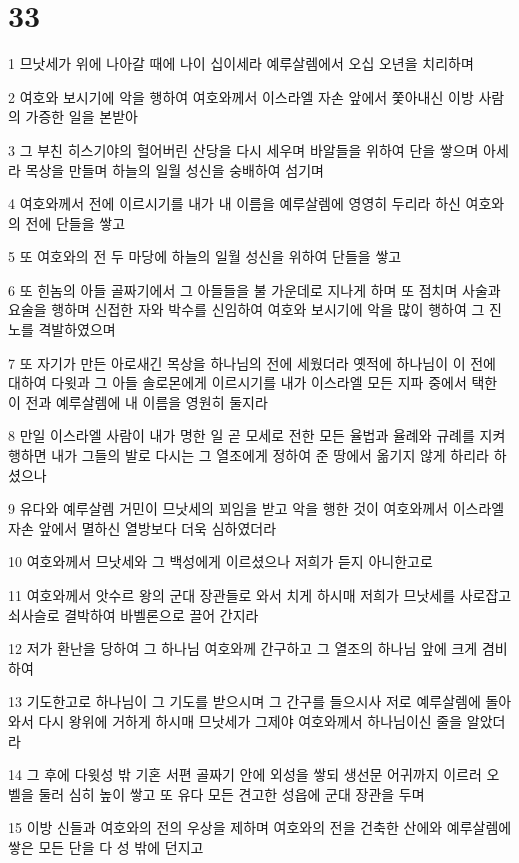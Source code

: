 \chapter{33}

\par 1 므낫세가 위에 나아갈 때에 나이 십이세라 예루살렘에서 오십 오년을 치리하며
\par 2 여호와 보시기에 악을 행하여 여호와께서 이스라엘 자손 앞에서 쫓아내신 이방 사람의 가증한 일을 본받아
\par 3 그 부친 히스기야의 헐어버린 산당을 다시 세우며 바알들을 위하여 단을 쌓으며 아세라 목상을 만들며 하늘의 일월 성신을 숭배하여 섬기며
\par 4 여호와께서 전에 이르시기를 내가 내 이름을 예루살렘에 영영히 두리라 하신 여호와의 전에 단들을 쌓고
\par 5 또 여호와의 전 두 마당에 하늘의 일월 성신을 위하여 단들을 쌓고
\par 6 또 힌놈의 아들 골짜기에서 그 아들들을 불 가운데로 지나게 하며 또 점치며 사술과 요술을 행하며 신접한 자와 박수를 신임하여 여호와 보시기에 악을 많이 행하여 그 진노를 격발하였으며
\par 7 또 자기가 만든 아로새긴 목상을 하나님의 전에 세웠더라 옛적에 하나님이 이 전에 대하여 다윗과 그 아들 솔로몬에게 이르시기를 내가 이스라엘 모든 지파 중에서 택한 이 전과 예루살렘에 내 이름을 영원히 둘지라
\par 8 만일 이스라엘 사람이 내가 명한 일 곧 모세로 전한 모든 율법과 율례와 규례를 지켜 행하면 내가 그들의 발로 다시는 그 열조에게 정하여 준 땅에서 옮기지 않게 하리라 하셨으나
\par 9 유다와 예루살렘 거민이 므낫세의 꾀임을 받고 악을 행한 것이 여호와께서 이스라엘 자손 앞에서 멸하신 열방보다 더욱 심하였더라
\par 10 여호와께서 므낫세와 그 백성에게 이르셨으나 저희가 듣지 아니한고로
\par 11 여호와께서 앗수르 왕의 군대 장관들로 와서 치게 하시매 저희가 므낫세를 사로잡고 쇠사슬로 결박하여 바벨론으로 끌어 간지라
\par 12 저가 환난을 당하여 그 하나님 여호와께 간구하고 그 열조의 하나님 앞에 크게 겸비하여
\par 13 기도한고로 하나님이 그 기도를 받으시며 그 간구를 들으시사 저로 예루살렘에 돌아와서 다시 왕위에 거하게 하시매 므낫세가 그제야 여호와께서 하나님이신 줄을 알았더라
\par 14 그 후에 다윗성 밖 기혼 서편 골짜기 안에 외성을 쌓되 생선문 어귀까지 이르러 오벨을 둘러 심히 높이 쌓고 또 유다 모든 견고한 성읍에 군대 장관을 두며
\par 15 이방 신들과 여호와의 전의 우상을 제하며 여호와의 전을 건축한 산에와 예루살렘에 쌓은 모든 단을 다 성 밖에 던지고
